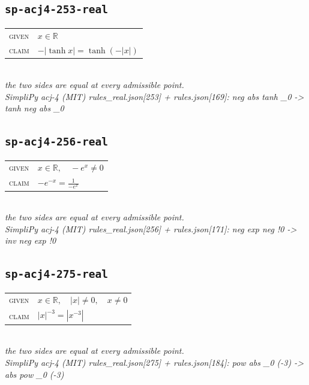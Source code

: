 \documentclass[11pt]{article}
\begin{document}
\subsection*{\texttt{sp-acj4-253-real}}
\begin{tabular}{@{}l@{\quad}l@{}}
\textsc{given} & $x \in \mathbb{R}$ \\[4pt]
\textsc{claim} & $\displaystyle -\left|\tanh x\right| = \tanh\left(-\left|x\right|\right)$ \\
\end{tabular}\\[2pt]
{\small\emph{the two sides are equal at every admissible point.}}\\
\emph{SimpliPy acj-4 (MIT) rules\_real.json[253] + rules.json[169]: neg abs tanh \_0  ->  tanh neg abs \_0}\\

\subsection*{\texttt{sp-acj4-256-real}}
\begin{tabular}{@{}l@{\quad}l@{}}
\textsc{given} & $x \in \mathbb{R},\quad -e^{x} \neq 0$ \\[4pt]
\textsc{claim} & $\displaystyle -e^{-x} = \frac{1}{-e^{x}}$ \\
\end{tabular}\\[2pt]
{\small\emph{the two sides are equal at every admissible point.}}\\
\emph{SimpliPy acj-4 (MIT) rules\_real.json[256] + rules.json[171]: neg exp neg !0  ->  inv neg exp !0}\\

\subsection*{\texttt{sp-acj4-275-real}}
\begin{tabular}{@{}l@{\quad}l@{}}
\textsc{given} & $x \in \mathbb{R},\quad \left|x\right| \neq 0,\quad x \neq 0$ \\[4pt]
\textsc{claim} & $\displaystyle \left|x\right|^{-3} = \left|x^{-3}\right|$ \\
\end{tabular}\\[2pt]
{\small\emph{the two sides are equal at every admissible point.}}\\
\emph{SimpliPy acj-4 (MIT) rules\_real.json[275] + rules.json[184]: pow abs \_0 (-3)  ->  abs pow \_0 (-3)}\\
\end{document}
